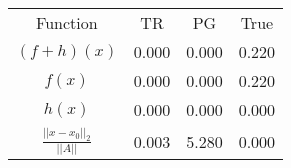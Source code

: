 \begin{tabular}{| c |c |c |c |}
    \hline
    \rowcolor[gray]{0.9}
\multicolumn{4}{|c|}{Minima} \\ \hline Function & TR & PG & True \\
    \hline
  \rowcolor[gray]{0.7}
    $ (f + h)(x) $ & 0.000 & 0.000 & 0.220 \\
  \hline
  \rowcolor[gray]{0.8}
    $ f(x) $ & 0.000 & 0.000 & 0.220 \\
  \hline
  \rowcolor[gray]{0.7}
    $ h(x) $ & 0.000 & 0.000 & 0.000 \\
  \hline
  \rowcolor[gray]{0.8}
    $ \frac{||x - x_0||_2}{||A||} $ & 0.003 & 5.280 & 0.000 \\
  \hline
\end{tabular}
